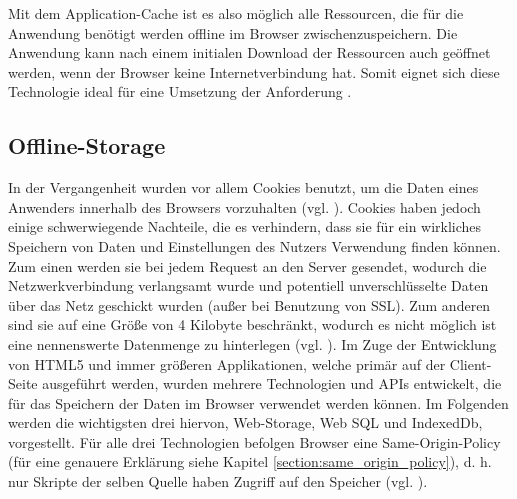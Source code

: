 Mit dem Application-Cache ist es also möglich alle Ressourcen, die für die Anwendung benötigt werden offline im Browser zwischenzuspeichern. Die Anwendung kann nach einem initialen Download der Ressourcen auch geöffnet werden, wenn der Browser keine Internetverbindung hat. Somit eignet sich diese Technologie ideal für eine Umsetzung der Anforderung .

\subsection{Offline-Storage}\label{section:offline_storage}
In der Vergangenheit wurden vor allem Cookies benutzt, um die Daten eines Anwenders innerhalb des Browsers vorzuhalten (vgl. \cite{Mahemoff22010}). Cookies haben jedoch einige schwerwiegende Nachteile, die es verhindern, dass sie für ein wirkliches Speichern von Daten und Einstellungen des Nutzers Verwendung finden können. Zum einen werden sie bei jedem Request an den Server gesendet, wodurch die Netzwerkverbindung verlangsamt wurde und potentiell unverschlüsselte Daten über das Netz geschickt wurden (außer bei Benutzung von SSL). Zum anderen sind sie auf eine Größe von 4 Kilobyte beschränkt, wodurch es nicht möglich ist eine nennenswerte Datenmenge zu hinterlegen (vgl. \cite{html5upandrunningchapter7}). Im Zuge der Entwicklung von HTML5 und immer größeren Applikationen, welche primär auf der Client-Seite ausgeführt werden, wurden mehrere Technologien und APIs entwickelt, die für das Speichern der Daten im Browser verwendet werden können. Im Folgenden werden die wichtigsten drei hiervon, Web-Storage, Web SQL und IndexedDb, vorgestellt. Für alle drei Technologien befolgen Browser eine Same-Origin-Policy (für eine genauere Erklärung siehe Kapitel \ref{section:same_origin_policy}), d. h. nur Skripte der selben Quelle haben Zugriff auf den Speicher (vgl. \cite{Mahemoff2010}).

